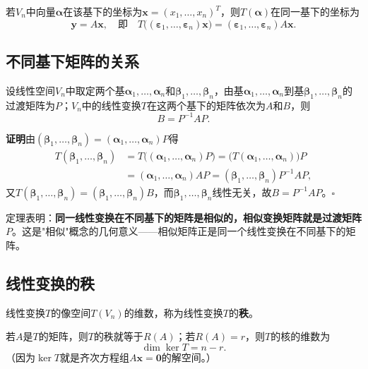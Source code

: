 若$V_n$中向量$\boldsymbol{\alpha}$在该基下的坐标为$\boldsymbol{x}=(x_1,\dots,x_n)^{T}$，则$T(\boldsymbol{\alpha})$在同一基下的坐标为
\[
\boldsymbol{y}=A\boldsymbol{x},
\quad\text{即}\quad
T\bigl((\boldsymbol{\varepsilon}_1,\dots,\boldsymbol{\varepsilon}_n)\boldsymbol{x}\bigr)
=(\boldsymbol{\varepsilon}_1,\dots,\boldsymbol{\varepsilon}_n)A\boldsymbol{x}.
\]

\subsection{不同基下矩阵的关系}
\begin{theorem}[同一线性变换在不同基下的矩阵相似]
设线性空间$V_n$中取定两个基$\boldsymbol{\alpha}_1,\dots,\boldsymbol{\alpha}_n$和$\boldsymbol{\beta}_1,\dots,\boldsymbol{\beta}_n$，由基$\boldsymbol{\alpha}_1,\dots,\boldsymbol{\alpha}_n$到基$\boldsymbol{\beta}_1,\dots,\boldsymbol{\beta}_n$的过渡矩阵为$P$；$V_n$中的线性变换$T$在这两个基下的矩阵依次为$A$和$B$，则
\[
B=P^{-1}AP .
\]
\end{theorem}

\textbf{证明}\quad 由$(\boldsymbol{\beta}_1,\dots,\boldsymbol{\beta}_n)=(\boldsymbol{\alpha}_1,\dots,\boldsymbol{\alpha}_n)P$得
\[
\begin{aligned}
T(\boldsymbol{\beta}_1,\dots,\boldsymbol{\beta}_n)
&=T\bigl((\boldsymbol{\alpha}_1,\dots,\boldsymbol{\alpha}_n)P\bigr)
=\bigl(T(\boldsymbol{\alpha}_1,\dots,\boldsymbol{\alpha}_n)\bigr)P\\
&=(\boldsymbol{\alpha}_1,\dots,\boldsymbol{\alpha}_n)AP
=(\boldsymbol{\beta}_1,\dots,\boldsymbol{\beta}_n)P^{-1}AP,
\end{aligned}
\]
又$T(\boldsymbol{\beta}_1,\dots,\boldsymbol{\beta}_n)=(\boldsymbol{\beta}_1,\dots,\boldsymbol{\beta}_n)B$，而$\boldsymbol{\beta}_1,\dots,\boldsymbol{\beta}_n$线性无关，故$B=P^{-1}AP$。\hfill$\square$

定理表明：\textbf{同一线性变换在不同基下的矩阵是相似的，相似变换矩阵就是过渡矩阵$P$}。这是"相似"概念的几何意义——相似矩阵正是同一个线性变换在不同基下的矩阵。

\subsection{线性变换的秩}
\begin{definition}[线性变换的秩]
线性变换$T$的像空间$T(V_n)$的维数，称为线性变换$T$的\textbf{秩}。
\end{definition}

若$A$是$T$的矩阵，则$T$的秩就等于$R(A)$；若$R(A)=r$，则$T$的核的维数为
\[
\dim\ker T=n-r .
\]
（因为$\ker T$就是齐次方程组$A\boldsymbol{x}=\boldsymbol{0}$的解空间。）

